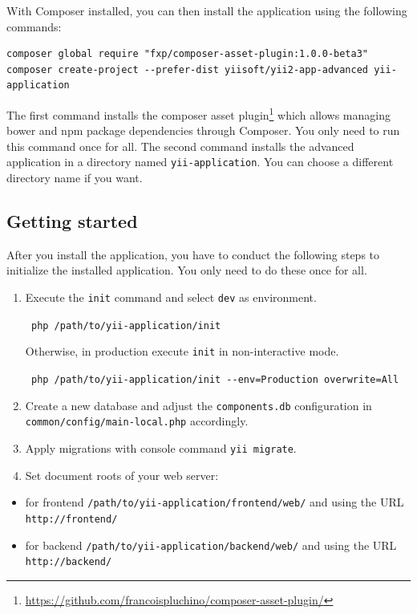 With Composer installed, you can then install the application using the following commands:

\begin{lstlisting}
composer global require "fxp/composer-asset-plugin:1.0.0-beta3"
composer create-project --prefer-dist yiisoft/yii2-app-advanced yii-application
\end{lstlisting}
The first command installs the composer asset plugin\footnote{\url{https://github.com/francoispluchino/composer-asset-plugin/}}
which allows managing bower and npm package dependencies through Composer. You only need to run this command
once for all. The second command installs the advanced application in a directory named \lstinline|yii-application|.
You can choose a different directory name if you want.

\subsection{Getting started}
After you install the application, you have to conduct the following steps to initialize
the installed application. You only need to do these once for all.

\begin{enumerate}
\item Execute the \lstinline|init| command and select \lstinline|dev| as environment.

 \lstinline| php /path/to/yii-application/init |

 Otherwise, in production execute \lstinline|init| in non-interactive mode.

 \lstinline| php /path/to/yii-application/init --env=Production overwrite=All |


\item Create a new database and adjust the \lstinline|components.db| configuration in \lstinline|common/config/main-local.php| accordingly.
\item Apply migrations with console command \lstinline|yii migrate|.
\item Set document roots of your web server:
\end{enumerate}
\begin{itemize}
\item for frontend \lstinline|/path/to/yii-application/frontend/web/| and using the URL \lstinline|http://frontend/|
\item for backend \lstinline|/path/to/yii-application/backend/web/| and using the URL \lstinline|http://backend/|
\end{itemize}
